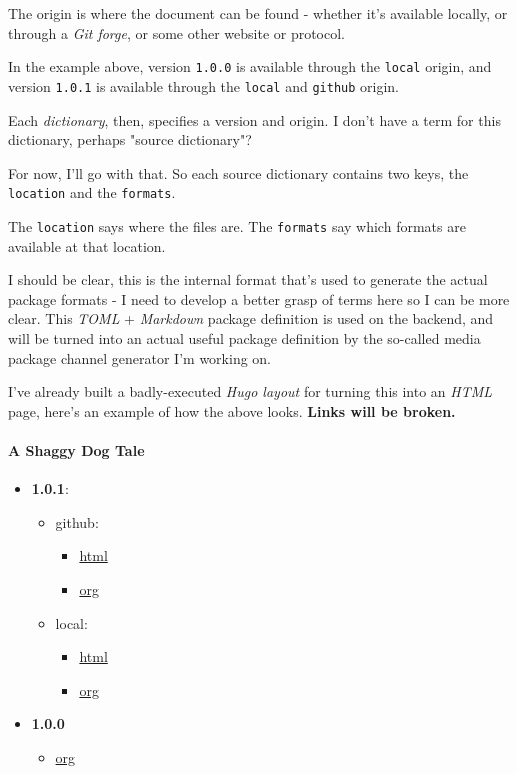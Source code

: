 \documentclass[11pt]{article}
\begin{document}
The origin is where the document can be found - whether it's available
locally, or through a \emph{Git forge}, or some other website or protocol.

In the example above, version \texttt{1.0.0} is available through the \texttt{local}
origin, and version \texttt{1.0.1} is available through the \texttt{local} and
\texttt{github} origin.

Each \emph{dictionary}, then, specifies a version and origin. I don't have
a term for this dictionary, perhaps "source dictionary"?

For now, I'll go with that. So each source dictionary contains two
keys, the \texttt{location} and the \texttt{formats}.

The \texttt{location} says where the files are. The \texttt{formats} say which
formats are available at that location.

I should be clear, this is the internal format that's used to generate
the actual package formats - I need to develop a better grasp of terms
here so I can be more clear. This \emph{TOML} + \emph{Markdown} package
definition is used on the backend, and will be turned into an actual
useful package definition by the so-called media package channel
generator I'm working on.

I've already built a badly-executed \emph{Hugo layout} for turning this
into an \emph{HTML} page, here's an example of how the above looks. \textbf{Links
will be broken.}

\paragraph*{A Shaggy Dog Tale}
\label{sec:org7afe360}
\begin{itemize}
\item \textbf{1.0.1}:
\begin{itemize}
\item github:
\begin{itemize}
\item \href{https://github.com/emsenn/shaggy-dog-tale/blob/master/shaggy-dog-tale.html}{html}
\item \href{https://github.com/emsenn/shaggy-dog-tale/blob/master/shaggy-dog-tale.org}{org}
\end{itemize}
\item local:
\begin{itemize}
\item \href{https://mepach.emsenn.net/store/shaggy-dog-tale/1.0.1/shaggy-dog-tale.html}{html}
\item \href{https://mepach.emsenn.net/store/shaggy-dog-tale/1.0.1/shaggy-dog-tale.org}{org}
\end{itemize}
\end{itemize}
\item \textbf{1.0.0}
\begin{itemize}
\item \href{https://mepach.emsenn.net/store/shaggy-dog-tale/1.0.0/shaggy-dog-tale.org}{org}
\end{itemize}
\end{itemize}
\end{document}
